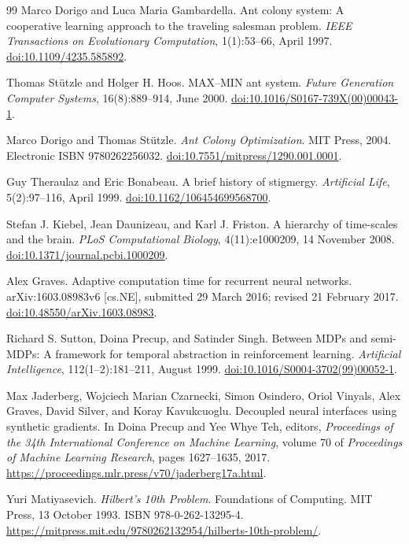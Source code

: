 \documentclass[11pt,oneside]{book}
\theoremstyle{remark}
\begin{document}
\begin{thebibliography}{99}
Marco Dorigo and Luca Maria Gambardella.
\newblock Ant colony system: A cooperative learning approach to the traveling salesman problem.
\newblock \emph{IEEE Transactions on Evolutionary Computation}, 1(1):53--66,
April 1997.
\newblock \href{https://doi.org/10.1109/4235.585892}
{doi:10.1109/4235.585892}.

Thomas St\"utzle and Holger H. Hoos.
\newblock MAX--MIN ant system.
\newblock \emph{Future Generation Computer Systems}, 16(8):889--914, June
2000.
\newblock \href{https://doi.org/10.1016/S0167-739X(00)00043-1}
{doi:10.1016/S0167-739X(00)00043-1}.

Marco Dorigo and Thomas St\"utzle.
\newblock \emph{Ant Colony Optimization}.
\newblock MIT Press, 2004. Electronic ISBN 9780262256032.
\newblock \href{https://doi.org/10.7551/mitpress/1290.001.0001}
{doi:10.7551/mitpress/1290.001.0001}.

Guy Theraulaz and Eric Bonabeau.
\newblock A brief history of stigmergy.
\newblock \emph{Artificial Life}, 5(2):97--116, April 1999.
\newblock \href{https://doi.org/10.1162/106454699568700}
{doi:10.1162/106454699568700}.

Stefan J. Kiebel, Jean Daunizeau, and Karl J. Friston.
\newblock A hierarchy of time-scales and the brain.
\newblock \emph{PLoS Computational Biology}, 4(11):e1000209, 14 November 2008.
\newblock \href{https://doi.org/10.1371/journal.pcbi.1000209}
{doi:10.1371/journal.pcbi.1000209}.

Alex Graves.
\newblock Adaptive computation time for recurrent neural networks.
\newblock arXiv:1603.08983v6 [cs.NE], submitted 29 March 2016; revised
21 February 2017.
\newblock \href{https://doi.org/10.48550/arXiv.1603.08983}
{doi:10.48550/arXiv.1603.08983}.

Richard S. Sutton, Doina Precup, and Satinder Singh.
\newblock Between MDPs and semi-MDPs: A framework for temporal abstraction in reinforcement learning.
\newblock \emph{Artificial Intelligence}, 112(1--2):181--211, August 1999.
\newblock \href{https://doi.org/10.1016/S0004-3702(99)00052-1}
{doi:10.1016/S0004-3702(99)00052-1}.

Max Jaderberg, Wojciech Marian Czarnecki, Simon Osindero, Oriol Vinyals,
Alex Graves, David Silver, and Koray Kavukcuoglu.
\newblock Decoupled neural interfaces using synthetic gradients.
\newblock In Doina Precup and Yee Whye Teh, editors,
\emph{Proceedings of the 34th International Conference on Machine Learning},
volume 70 of \emph{Proceedings of Machine Learning Research}, pages
1627--1635, 2017.
\newblock \url{https://proceedings.mlr.press/v70/jaderberg17a.html}.

Yuri Matiyasevich.
\newblock \emph{Hilbert's 10th Problem}.
\newblock Foundations of Computing. MIT Press, 13 October 1993.
\newblock ISBN 978-0-262-13295-4.
\newblock
\url{https://mitpress.mit.edu/9780262132954/hilberts-10th-problem/}.

\end{thebibliography}
\end{document}
